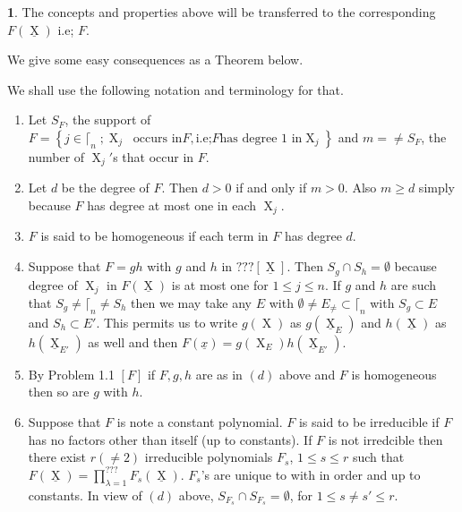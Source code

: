 \documentclass[a4paper,12pt]{article}
\DeclareMathOperator{\x}{\mathrm{X}}
\theoremstyle{definition}
\theoremstyle{underlinethm}
\theoremstyle{underline}
\newtheorem{subsubsec}{}[subsection]
\begin{document}
 \begin{subsubsec}\label{subsubsection-2.2.2}
 The concepts and properties above will be transferred to the corresponding $F(\underline{\x})$ i.e; $F$.
 
 We give some easy consequences as a Theorem below.
 
 We shall use the following notation and terminology for that.
 \end{subsubsec}
 
 \begin{enumerate}[label=(\alph*)]
 
 \item  Let $S_{F}$, the support of $F =\left\{ j \in \lceil_{n} \; ; \x_{j}\;\; \text{occurs in} F, \text{i.e;}  F \text{has degree 1 in} \x_{j} \right\}$ and $m = \neq S_{F}$, the number of $\x_{j}'$s that occur in $F$.
 
 \item Let $d$ be the degree of $F$. Then $d > 0$ if and only if $m > 0$. Also $m \geq d$ simply because $F$ has degree at most one in each $\x_{j}$.
 
 \item $F$ is said to be homogeneous if each term in $F$ has degree $d$.  
 
 \item Suppose that $F = gh$ with $g$ and $h$ in $??? [\underline{\x}]$. Then $S_{g} \cap S_{h} = \emptyset$ because degree of $\x_{j}$ in $F(\underline{\x})$ is at most one for $1 \leq j \leq n$. If $g$ and $h$ are such that $S_{g} \neq \lceil_{n} \neq S_{h}$ then we may take any $E$ with $\emptyset \neq E_{\neq}\subset \lceil_{n}$ with $S_{g} \subset E$ and $S_{h} \subset E'$. This permits us to write $g(\x)$ as $g(\underline{\x}_{E})$ and $h(\underline{\x})$ as $h(\underline{\x}_{E'})$ as well and then $F(\underline{x}) = g(\x_{E}) h (\underline{\x}_{E'})$.
 
 \item By Problem 1.1 $[F]$ if $F, g, h$ are as in $(d)$ above and $F$ is homogeneous then so are $g$ with $h$.
 
 \item Suppose that $F$ is note a constant polynomial. $F$ is said to be irreducible if $F$ has no factors other than itself (up to constants). If $F$ is not irredcible then there exist $r(\neq 2)$ irreducible polynomials $F_{s}$, $1 \leq s \leq r$ such that $F(\underline{\x}) = \prod\limits_{\lambda = 1}^{???} F_{s} (\underline{\x})$. $F_{s}$'s are unique to with in order and up to constants. In view of $(d)$ above, $S_{F_{s}} \cap S_{F_{s}} = \emptyset$, for $1 \leq s \neq s' \leq r$.
 \end{enumerate}
 
\end{document}
